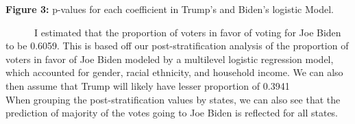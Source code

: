 \documentclass[
]{article}
\begin{document}
\textbf{Figure 3:} p-values for each coefficient in Trump's and Biden's
logistic Model.

~~~~~~I estimated that the proportion of voters in favor of voting for
Joe Biden to be 0.6059. This is based off our post-stratification
analysis of the proportion of voters in favor of Joe Biden modeled by a
multilevel logistic regression model, which accounted for gender, racial
ethnicity, and household income. We can also then assume that Trump will
likely have lesser proportion of 0.3941\\
\hspace*{0.333em}\hspace*{0.333em}\hspace*{0.333em}\hspace*{0.333em}\hspace*{0.333em}\hspace*{0.333em}When
grouping the post-stratification values by states, we can also see that
the prediction of majority of the votes going to Joe Biden is reflected
for all states.
\end{document}
